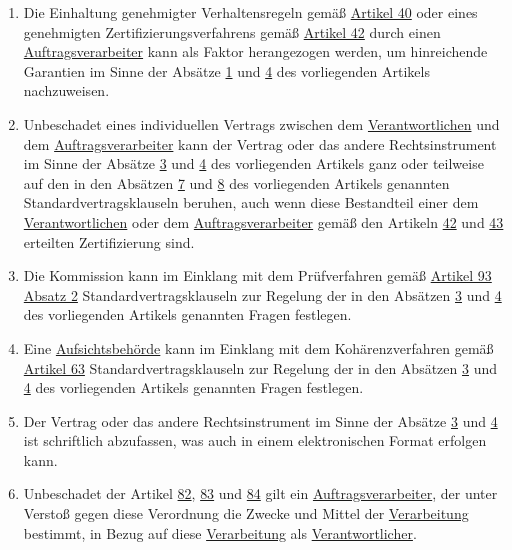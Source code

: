 \begin{enumerate}
  \item Die Einhaltung genehmigter Verhaltensregeln gemäß \hyperref[ch:40]{Artikel 40} oder eines genehmigten
   Zertifizierungsverfahrens gemäß \hyperref[ch:42]{Artikel 42} durch einen \hyperref[itm:04-8]
   {Auftragsverarbeiter} kann als Faktor herangezogen werden, um hinreichende Garantien im Sinne der Absätze \hyperref
   [itm:28-1]{1} und \hyperref[itm:28-4]{4} des vorliegenden Artikels nachzuweisen.
  \label{itm:28-5}

  \item Unbeschadet eines individuellen Vertrags zwischen dem \hyperref[itm:04-7]{Verantwortlichen} und dem \hyperref
   [itm:04-8]{Auftragsverarbeiter} kann der Vertrag oder das andere Rechtsinstrument im Sinne der Absätze \hyperref
   [itm:28-3-1]{3} und \hyperref[itm:28-4]{4} des vorliegenden Artikels ganz oder teilweise auf den in den
   Absätzen \hyperref[itm:28-7]{7} und \hyperref[itm:28-8]{8} des vorliegenden Artikels genannten
   Standardvertragsklauseln beruhen, auch wenn diese Bestandteil einer dem
   \hyperref[itm:04-7]{Verantwortlichen} oder dem \hyperref[itm:04-8]{Auftragsverarbeiter} gemäß den Artikeln \hyperref
    [ch:42]{42} und \hyperref[ch:43]{43} erteilten Zertifizierung sind.
  \label{itm:28-6}

  \item Die Kommission kann im Einklang mit dem Prüfverfahren gemäß \hyperref[itm:93-2]{Artikel 93
   Absatz 2} Standardvertragsklauseln zur Regelung der in den Absätzen \hyperref[itm:28-3-1]{3} und \hyperref[itm:28-4]
   {4} des vorliegenden Artikels genannten Fragen festlegen.
  \label{itm:28-7}

  \item Eine \hyperref[itm:04-21]{Aufsichtsbehörde} kann im Einklang mit dem Kohärenzverfahren gemäß \hyperref[ch:63]
   {Artikel 63} Standardvertragsklauseln zur Regelung der in den Absätzen \hyperref[itm:28-3-1]{3} und \hyperref
   [itm:28-4]{4} des vorliegenden Artikels genannten Fragen festlegen.
  \label{itm:28-8}

  \item Der Vertrag oder das andere Rechtsinstrument im Sinne der Absätze \hyperref[itm:28-3-1]{3} und \hyperref
   [itm:28-4]{4} ist schriftlich abzufassen, was auch in einem elektronischen Format erfolgen kann.
  \label{itm:28-9}

  \item Unbeschadet der Artikel \hyperref[ch:82]{82}, \hyperref[ch:83]{83} und \hyperref[ch:84]{84} gilt ein
   \hyperref[itm:04-8]{Auftragsverarbeiter}, der unter Verstoß gegen diese Verordnung die Zwecke und Mittel
    der \hyperref[itm:04-2]{Verarbeitung} bestimmt, in Bezug auf diese \hyperref[itm:04-2]{Verarbeitung} als \hyperref
    [itm:04-7]{Verantwortlicher}.
  \label{itm:28-10}

\end{enumerate}



